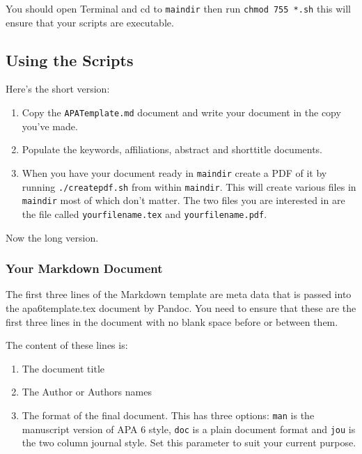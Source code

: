 You should open Terminal and cd to \texttt{maindir} then run
\texttt{chmod 755 *.sh} this will ensure that your scripts are
executable.

\subsection{Using the Scripts}\label{using-the-scripts}

Here's the short version:

\begin{enumerate}
\def\labelenumi{\arabic{enumi}.}
\itemsep1pt\parskip0pt
\item
  Copy the \texttt{APATemplate.md} document and write your document in
  the copy you've made.
\item
  Populate the keywords, affiliations, abstract and shorttitle
  documents.
\item
  When you have your document ready in \texttt{maindir} create a PDF of
  it by running \texttt{./createpdf.sh} from within \texttt{maindir}.
  This will create various files in \texttt{maindir} most of which don't
  matter. The two files you are interested in are the file called
  \texttt{yourfilename.tex} and \texttt{yourfilename.pdf}.
\end{enumerate}

Now the long version.

\subsubsection{Your Markdown Document}\label{your-markdown-document}

The first three lines of the Markdown template are meta data that is
passed into the apa6template.tex document by Pandoc. You need to ensure
that these are the first three lines in the document with no blank space
before or between them.

The content of these lines is:

\begin{enumerate}
\def\labelenumi{\arabic{enumi}.}
\itemsep1pt\parskip0pt
\item
  The document title
\item
  The Author or Authors names
\item
  The format of the final document. This has three options: \texttt{man}
  is the manuscript version of APA 6 style, \texttt{doc} is a plain
  document format and \texttt{jou} is the two column journal style. Set
  this parameter to suit your current purpose.
\end{enumerate}


